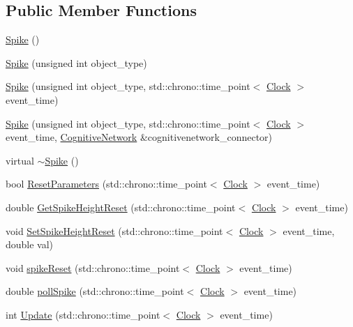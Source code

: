 \subsection*{Public Member Functions}
\begin{DoxyCompactItemize}
\item 
\mbox{\hyperlink{classSpike_a1f82ea9e43a3a71b878261753c722dd9}{Spike}} ()
\item 
\mbox{\hyperlink{classSpike_a3e6dbba4e235f7adb02ade45c918b266}{Spike}} (unsigned int object\+\_\+type)
\item 
\mbox{\hyperlink{classSpike_a9368fb7b20887e5f02f3de6176f04c02}{Spike}} (unsigned int object\+\_\+type, std\+::chrono\+::time\+\_\+point$<$ \mbox{\hyperlink{universe_8h_a0ef8d951d1ca5ab3cfaf7ab4c7a6fd80}{Clock}} $>$ event\+\_\+time)
\item 
\mbox{\hyperlink{classSpike_afecf811f48103b529016a73349b50fe4}{Spike}} (unsigned int object\+\_\+type, std\+::chrono\+::time\+\_\+point$<$ \mbox{\hyperlink{universe_8h_a0ef8d951d1ca5ab3cfaf7ab4c7a6fd80}{Clock}} $>$ event\+\_\+time, \mbox{\hyperlink{classCognitiveNetwork}{Cognitive\+Network}} \&cognitivenetwork\+\_\+connector)
\item 
virtual \mbox{\hyperlink{classSpike_a6c2c62e81cb32ca4eb73bc686974d00d}{$\sim$\+Spike}} ()
\item 
bool \mbox{\hyperlink{classSpike_af4475560da7a33e70a0f2036197f000f}{Reset\+Parameters}} (std\+::chrono\+::time\+\_\+point$<$ \mbox{\hyperlink{universe_8h_a0ef8d951d1ca5ab3cfaf7ab4c7a6fd80}{Clock}} $>$ event\+\_\+time)
\item 
double \mbox{\hyperlink{classSpike_a6266871881a2581aaee499f6a10e1841}{Get\+Spike\+Height\+Reset}} (std\+::chrono\+::time\+\_\+point$<$ \mbox{\hyperlink{universe_8h_a0ef8d951d1ca5ab3cfaf7ab4c7a6fd80}{Clock}} $>$ event\+\_\+time)
\item 
void \mbox{\hyperlink{classSpike_a872adf39d66b0f491fb179c9745d7d11}{Set\+Spike\+Height\+Reset}} (std\+::chrono\+::time\+\_\+point$<$ \mbox{\hyperlink{universe_8h_a0ef8d951d1ca5ab3cfaf7ab4c7a6fd80}{Clock}} $>$ event\+\_\+time, double val)
\item 
void \mbox{\hyperlink{classSpike_acce1cc96e84e7cbf3b68010ab32f045e}{spike\+Reset}} (std\+::chrono\+::time\+\_\+point$<$ \mbox{\hyperlink{universe_8h_a0ef8d951d1ca5ab3cfaf7ab4c7a6fd80}{Clock}} $>$ event\+\_\+time)
\item 
double \mbox{\hyperlink{classSpike_ac465dbe6500f1eb1f5421f7174f91dd3}{poll\+Spike}} (std\+::chrono\+::time\+\_\+point$<$ \mbox{\hyperlink{universe_8h_a0ef8d951d1ca5ab3cfaf7ab4c7a6fd80}{Clock}} $>$ event\+\_\+time)
\item 
int \mbox{\hyperlink{classSpike_a683a0ca5e62e68777381fc85f4bf3019}{Update}} (std\+::chrono\+::time\+\_\+point$<$ \mbox{\hyperlink{universe_8h_a0ef8d951d1ca5ab3cfaf7ab4c7a6fd80}{Clock}} $>$ event\+\_\+time)
\end{DoxyCompactItemize}
